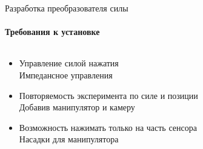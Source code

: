 \documentclass[aspectratio=169,xcolor=table]{beamer}
\begin{document}
\begin{frame}[t]{Разработка преобразователя силы}
    \framesubtitle{Требования к установке}
    \vspace{-0.5cm}
    \begin{columns}[T,onlytextwidth]
        \begin{column}{0.39\textwidth}
            \begin{itemize}
                \item Управление силой нажатия {\\ \alert{Импедансное управления}}
                \item Повторяемость эксперимента по силе и позиции{\\ \alert{Добавив манипулятор и камеру}}
                \item Возможность нажимать только на часть сенсора{\\ \alert{Насадки для манипулятора}}
            \end{itemize}
        \end{column}
        \begin{column}{0.8\textwidth}
\end{column}
\end{columns}
\end{frame}
\end{document}
